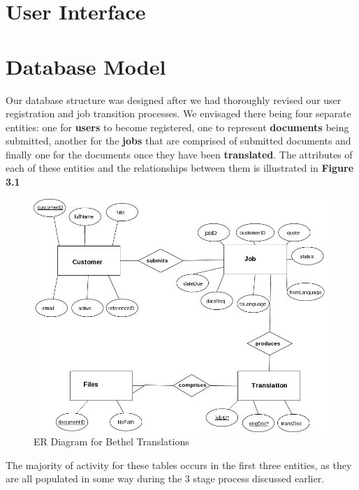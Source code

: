 \documentclass{l3proj}
\begin{document}


\section{User Interface}

\section{Database Model}

Our database structure was designed after we had thoroughly revised our user registration and job transition processes. We envisaged there being four separate entities: one for \textbf{users} to become registered, one to represent \textbf{documents} being submitted, another for the \textbf{jobs} that are comprised of submitted documents and finally one for the documents once they have been \textbf{translated}. The attributes of each of these entities and the relationships between them is illustrated in \textbf{Figure 3.1} 

\begin{figure}
\begin{center}
\includegraphics[width=\linewidth]{bt-dbstruct}
\caption{ER Diagram for Bethel Translations}
\end{center}
\end{figure}

The majority of activity for these tables occurs in the first three entities, as they are all populated in some way during the 3 stage process discussed earlier.
\end{document}
